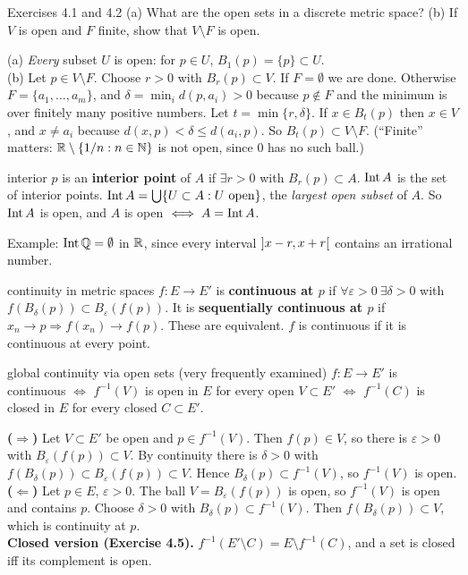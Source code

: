 \begin{exam}{Exercises 4.1 and 4.2}
(a) What are the open sets in a discrete metric space? (b) If $V$ is open and $F$ finite, show
that $V\setminus F$ is open.
\end{exam}
\begin{answer}
(a) \emph{Every} subset $U$ is open: for $p\in U$, $B_1(p)=\{p\}\subset U$.\\
(b) Let $p\in V\setminus F$. Choose $r>0$ with $B_r(p)\subset V$. If $F=\emptyset$ we are done.
Otherwise $F=\{a_1,\dots,a_m\}$, and $\delta=\min_i d(p,a_i)>0$ because $p\notin F$ and the
minimum is over finitely many positive numbers. Let $t=\min\{r,\delta\}$. If $x\in B_t(p)$ then
$x\in V$, and $x\ne a_i$ because $d(x,p)<\delta\le d(a_i,p)$. So $B_t(p)\subset V\setminus F$.
(``Finite'' matters: $\mathbb R\setminus\{1/n:n\in\mathbb N\}$ is not open, since $0$ has no such ball.)
\end{answer}

\begin{defn}{interior}
$p$ is an \textbf{interior point} of $A$ if $\exists r>0$ with $B_r(p)\subset A$.
$\operatorname{Int} A$ is the set of interior points. $\operatorname{Int} A=\bigcup\{U\subset A: U\text{ open}\}$, the
\emph{largest open subset} of $A$. So $\operatorname{Int} A$ is open, and $A$ is open $\iff A=\operatorname{Int} A$.
\end{defn}
Example: $\operatorname{Int}\mathbb Q=\emptyset$ in $\mathbb R$, since every interval $\mathopen{]}x-r,x+r\mathclose{[}$ contains an
irrational number.

\begin{defn}{continuity in metric spaces}
$f:E\to E'$ is \textbf{continuous at $p$} if $\forall\varepsilon>0\ \exists\delta>0$ with
$f(B_\delta(p))\subset B_\varepsilon(f(p))$. It is \textbf{sequentially continuous at $p$} if
$x_n\to p\Rightarrow f(x_n)\to f(p)$. These are equivalent. $f$ is continuous if it is continuous
at every point.
\end{defn}

\begin{thm}{global continuity via open sets (very frequently examined)}
$f:E\to E'$ is continuous $\iff$ $f^{-1}(V)$ is open in $E$ for every open $V\subset E'$
$\iff$ $f^{-1}(C)$ is closed in $E$ for every closed $C\subset E'$.
\end{thm}
\begin{answer}
\textbf{($\Rightarrow$)} Let $V\subset E'$ be open and $p\in f^{-1}(V)$. Then $f(p)\in V$, so
there is $\varepsilon>0$ with $B_\varepsilon(f(p))\subset V$. By continuity there is $\delta>0$
with $f(B_\delta(p))\subset B_\varepsilon(f(p))\subset V$. Hence $B_\delta(p)\subset f^{-1}(V)$,
so $f^{-1}(V)$ is open.\\
\textbf{($\Leftarrow$)} Let $p\in E$, $\varepsilon>0$. The ball $V=B_\varepsilon(f(p))$ is open,
so $f^{-1}(V)$ is open and contains $p$. Choose $\delta>0$ with $B_\delta(p)\subset f^{-1}(V)$.
Then $f(B_\delta(p))\subset V$, which is continuity at $p$.\\
\textbf{Closed version (Exercise 4.5).} $f^{-1}(E'\setminus C)=E\setminus f^{-1}(C)$, and a set
is closed iff its complement is open.
\end{answer}

